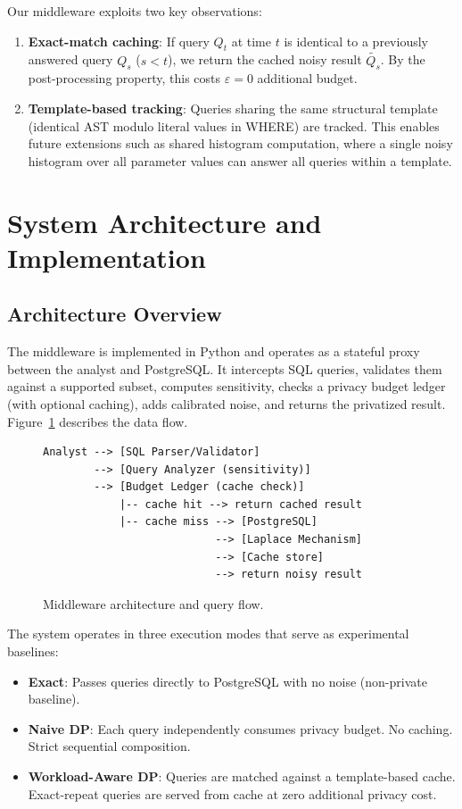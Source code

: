\documentclass[sigconf,nonacm]{acmart}
\begin{document}
Our middleware exploits two key observations:
\begin{enumerate}
    \item \textbf{Exact-match caching}: If query $Q_t$ at time $t$ is identical to a previously answered query $Q_s$ ($s < t$), we return the cached noisy result $\widetilde{Q_s}$. By the post-processing property, this costs $\varepsilon = 0$ additional budget.
    \item \textbf{Template-based tracking}: Queries sharing the same structural template (identical AST modulo literal values in WHERE) are tracked. This enables future extensions such as shared histogram computation, where a single noisy histogram over all parameter values can answer all queries within a template.
\end{enumerate}

\section{System Architecture and Implementation}
\label{sec:system}

\subsection{Architecture Overview}

The middleware is implemented in Python and operates as a stateful proxy between the analyst and PostgreSQL. It intercepts SQL queries, validates them against a supported subset, computes sensitivity, checks a privacy budget ledger (with optional caching), adds calibrated noise, and returns the privatized result. Figure~\ref{fig:arch} describes the data flow.

\begin{figure}[h]
\centering
\begin{verbatim}
Analyst --> [SQL Parser/Validator]
        --> [Query Analyzer (sensitivity)]
        --> [Budget Ledger (cache check)]
            |-- cache hit --> return cached result
            |-- cache miss --> [PostgreSQL]
                           --> [Laplace Mechanism]
                           --> [Cache store]
                           --> return noisy result
\end{verbatim}
\caption{Middleware architecture and query flow.}
\label{fig:arch}
\end{figure}

The system operates in three execution modes that serve as experimental baselines:
\begin{itemize}
    \item \textbf{Exact}: Passes queries directly to PostgreSQL with no noise (non-private baseline).
    \item \textbf{Naive DP}: Each query independently consumes privacy budget. No caching. Strict sequential composition.
    \item \textbf{Workload-Aware DP}: Queries are matched against a template-based cache. Exact-repeat queries are served from cache at zero additional privacy cost.
\end{itemize}
\end{document}
